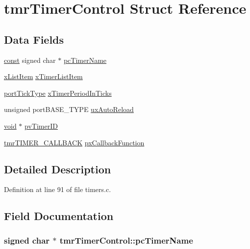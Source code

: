 \hypertarget{structtmr_timer_control}{\section{tmr\-Timer\-Control Struct Reference}
\label{structtmr_timer_control}
}
\subsection*{Data Fields}
\begin{DoxyCompactItemize}
\item 
\hyperlink{group___n_a_m_e_ga7ae6d0e43244213b34de2c2b9aa30da6}{const} signed char $\ast$ \hyperlink{structtmr_timer_control_a6fe9375a353c15ae85816e9eed4bac82}{pc\-Timer\-Name}
\item 
\hyperlink{_common_2_libraries_2_free_r_t_o_s_2_source_2include_2list_8h_abc3e65a10b5c5f39142e64e69311797f}{x\-List\-Item} \hyperlink{structtmr_timer_control_aef6cf82358f42f3e823a261514177364}{x\-Timer\-List\-Item}
\item 
\hyperlink{_s_t_m32_f10x_2_libraries_2_free_r_t_o_s_2_source_2portable_2_g_c_c_2_a_r_m___c_m3_2portmacro_8h_a4d746b2ff8fafc490b764c66411ec457}{port\-Tick\-Type} \hyperlink{structtmr_timer_control_a4a4c230e30165b29ec13a0ef8c76882e}{x\-Timer\-Period\-In\-Ticks}
\item 
unsigned port\-B\-A\-S\-E\-\_\-\-T\-Y\-P\-E \hyperlink{structtmr_timer_control_ae7e4e711ab55dd9a50e87ddfaafc93dd}{ux\-Auto\-Reload}
\item 
\hyperlink{group___n_a_m_e_ga18028b8badbf1ea7e704ccac3c488e82}{void} $\ast$ \hyperlink{structtmr_timer_control_afcfdeb1b4882baa66161acb0e621fa9f}{pv\-Timer\-I\-D}
\item 
\hyperlink{osx_2osx_2_libraries_2_free_r_t_o_s_2_source_2include_2timers_8h_aed251fe4d32d219374dc359ce7c84551}{tmr\-T\-I\-M\-E\-R\-\_\-\-C\-A\-L\-L\-B\-A\-C\-K} \hyperlink{structtmr_timer_control_a5500d53ad21f73300fa98f2b7888f9c2}{px\-Callback\-Function}
\end{DoxyCompactItemize}


\subsection{Detailed Description}


Definition at line 91 of file timers.\-c.



\subsection{Field Documentation}
\hypertarget{structtmr_timer_control_a6fe9375a353c15ae85816e9eed4bac82}{
\subsubsection[{pc\-Timer\-Name}]{ signed char $\ast$ tmr\-Timer\-Control\-::pc\-Timer\-Name}}\label{structtmr_timer_control_a6fe9375a353c15ae85816e9eed4bac82}


